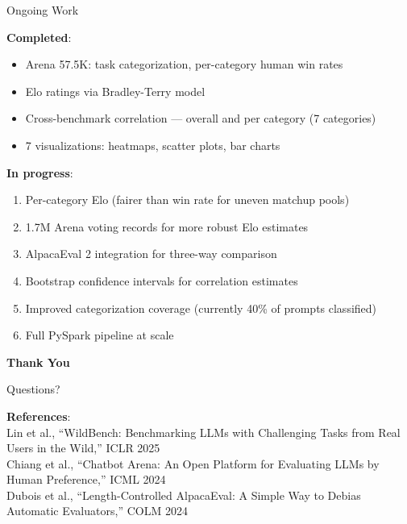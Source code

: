 \documentclass[aspectratio=169,11pt]{beamer}
\begin{document}
\begin{frame}{Ongoing Work}

\textbf{Completed}:
\begin{itemize}
    \item[\checkmark] Arena 57.5K: task categorization, per-category human win rates
    \item[\checkmark] Elo ratings via Bradley-Terry model
    \item[\checkmark] Cross-benchmark correlation --- overall and per category (7 categories)
    \item[\checkmark] 7 visualizations: heatmaps, scatter plots, bar charts
\end{itemize}

\vspace{0.5em}
\textbf{In progress}:
\begin{enumerate}
    \item Per-category Elo (fairer than win rate for uneven matchup pools)
    \item 1.7M Arena voting records for more robust Elo estimates
    \item AlpacaEval 2 integration for three-way comparison
    \item Bootstrap confidence intervals for correlation estimates
    \item Improved categorization coverage (currently 40\% of prompts classified)
    \item Full PySpark pipeline at scale
\end{enumerate}
\end{frame}

\begin{frame}{}
\vfill
\begin{center}
{\Large\textbf{Thank You}}

\vspace{1em}
{\large Questions?}

\vspace{2em}
{\small
\textbf{References}:\\[0.3em]
Lin et al., ``WildBench: Benchmarking LLMs with Challenging Tasks from Real Users in the Wild,'' ICLR 2025\\[0.2em]
Chiang et al., ``Chatbot Arena: An Open Platform for Evaluating LLMs by Human Preference,'' ICML 2024\\[0.2em]
Dubois et al., ``Length-Controlled AlpacaEval: A Simple Way to Debias Automatic Evaluators,'' COLM 2024
}
\end{center}
\vfill
\end{frame}
\end{document}
